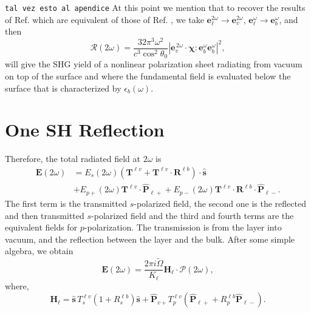 \documentclass[10pt]{book}
\begin{document}
\verb=tal vez esto al apendice=
At this point we mention that to recover the results of Ref.
\cite{mizrahiJOSA88} which are equivalent of those of Ref. \cite{sipePRB87}, we
take $\mathbf{e}^{2\omega}_{\ell}\to \mathbf{e}^{2\omega}_v$,
$\mathbf{e}^{\omega}_{\ell}\to \mathbf{e}^{\omega}_{b}$, 
and then
\begin{equation}\label{m69}
\mathcal{R}(2\omega) =
\frac{32\pi^{3} \omega^{2}}{c^{3}\cos^{2}\theta_0}
\left\vert
\mathbf{e}^{\,2\omega}_{v}\cdot\boldsymbol{\chi}:
\mathbf{e}^{\omega}_{b}\mathbf{e}^{\omega}_{b}
\right\vert^{2} 
,
\end{equation}
will give the SHG yield of a nonlinear polarization sheet radiating from vacuum
on top of the surface and where the fundamental field is evaluated below the
surface that is characterized by $\epsilon_{b}(\omega)$.


\section{One SH Reflection}
Therefore, the total radiated field at 
$2\omega$ is 
\begin{equation}\label{r7}
\begin{split}
\mathbf{E}(2\omega)  
&= E_s(2\omega)  
\left(
\mathbf{T}^{\ell v} + \mathbf{T}^{\ell v}\cdot\mathbf{R}^{\ell b}
\right)  
\cdot\hat{\mathbf{s}}\nonumber\\
&+ E_{p+}(2\omega)\mathbf{T}^{\ell v}\cdot\hat{\mathbf{P}}_{\ell +}
 + E_{p-}(2\omega)\mathbf{T}^{\ell v}
\cdot\mathbf{R}^{\ell b}\cdot\hat{\mathbf{P}}_{\ell-}.  
\end{split}
\end{equation} 
The first term is  the transmitted $s$-polarized field, the second one is the 
reflected and then transmitted $s$-polarized field and the third and fourth 
terms are the equivalent fields for $p$-polarization. The transmission is from 
the layer into vacuum, and the reflection between the layer and the bulk. After 
some simple algebra, we obtain 
\begin{equation}\label{r8}
\mathbf{E}(2\omega) = \frac{2\pi i\tilde{\Omega}}{K_{\ell}}
\mathbf{H}_{\ell}\cdot\boldsymbol{\mathcal{P}}(2\omega),
\end{equation} 
where,
\begin{equation}\label{r9}
\mathbf{H}_{\ell}
= \hat{\mathbf{s}}\,T_s^{\ell v}\left(1+R_s^{\ell b}\right)\hat{\mathbf{s}}
+ \hat{\mathbf{P}}_{v+}T_{p}^{\ell v}
\left(
\hat{\mathbf{P}}_{\ell +} +R_{p}^{\ell b}\hat{\mathbf{P}}_{\ell -}
\right). 
\end{equation}
\end{document}
